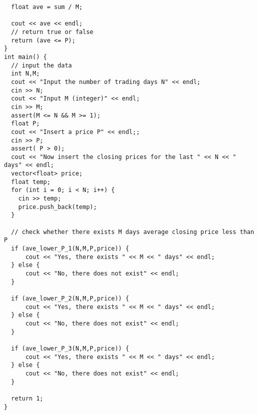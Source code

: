 \documentclass[11pt]{article}
\theoremstyle{remark}
\begin{document}
\begin{appendix}
\begin{lstlisting}
  float ave = sum / M;

  cout << ave << endl;
  // return true or false
  return (ave <= P);
}
int main() {
  // input the data
  int N,M;
  cout << "Input the number of trading days N" << endl;
  cin >> N;
  cout << "Input M (integer)" << endl;
  cin >> M;
  assert(M <= N && M >= 1);
  float P;
  cout << "Insert a price P" << endl;;
  cin >> P;
  assert( P > 0);
  cout << "Now insert the closing prices for the last " << N << " days" << endl;
  vector<float> price;
  float temp;
  for (int i = 0; i < N; i++) {
    cin >> temp;
    price.push_back(temp);
  }

  // check whether there exists M days average closing price less than P
  if (ave_lower_P_1(N,M,P,price)) {
      cout << "Yes, there exists " << M << " days" << endl;
  } else {
      cout << "No, there does not exist" << endl;
  }

  if (ave_lower_P_2(N,M,P,price)) {
      cout << "Yes, there exists " << M << " days" << endl;
  } else {
      cout << "No, there does not exist" << endl;
  }

  if (ave_lower_P_3(N,M,P,price)) {
      cout << "Yes, there exists " << M << " days" << endl;
  } else {
      cout << "No, there does not exist" << endl;
  }

  return 1;
}

\end{lstlisting}

\end{appendix}
\end{document}
